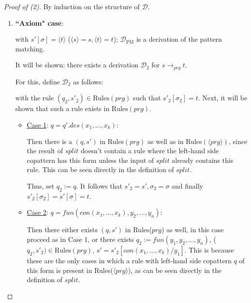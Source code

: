 \documentclass[11pt]{article} %
\begin{document}
\begin{proof}[Proof of (2)] By induction on the structure of $\mathcal{D}$.

\begin{enumerate}
\item \textbf{``Axiom" case}:

\begin{prooftree}
\end{prooftree}

with $s'[\sigma] = \langle t \rangle$ ($\langle s \rangle = s, \langle t \rangle = t$); $\mathcal{D}_{\textrm{PM}}$ is a derivation of the pattern matching.

It will be shown: there exists a derivation $\mathcal{D}_2$ for $s \longrightarrow_{prg} t$.

For this, define $\mathcal{D}_2$ as follows:

\begin{prooftree}
\end{prooftree}

with the rule $(q_2, s'_2) \in \textrm{Rules}(prg)$ such that $s'_2[\sigma_2] = t$. Next, it will be shown that such a rule exists in $\textrm{Rules}(prg)$.

\begin{itemize}
\item \underline{Case 1}: $q = q'.des(x_1, ..., x_k)$:

Then there is a $(q, s')$ in Rules$(prg)$ as well as in Rules$(\langle prg \rangle)$, since the result of $split$ doesn't contain a rule where the left-hand side copattern has this form unless the input of $split$ already contains this rule. This can be seen directly in the definition of $split$.

Thus, set $q_2 := q$. It follows that $s'_2 = s', \sigma_2 = \sigma$ and finally $s'_2[\sigma_2] = s'[\sigma] = t$.

\item \underline{Case 2}: $q = fun(con(x_1, ..., x_k), y_2, ..., y_n)$:

Then there either exists $(q, s')$ in Rules($prg$) as well, in this case proceed as in Case 1, or there exists $q_2 := fun(y_1, y_2, ..., y_n)$, ($q_2, s'_2) \in \textrm{Rules}(prg)$, $s' = s'_2[con(x_1, ..., x_k) / y_1]$. This is because these are the only cases in which a rule with left-hand side copattern $q$ of this form is present in Rules($\langle prg \rangle$), as can be seen directly in the definition of $split$.


\end{itemize}
\end{enumerate}
\end{proof}
\end{document}
